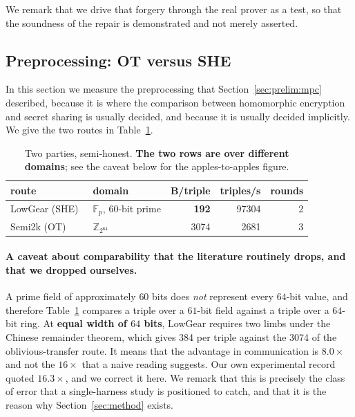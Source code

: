 \documentclass[11pt]{article}
\newcommand{\Z}{\mathbb{Z}}
\begin{document}
We remark that we drive that forgery through the real prover as a test, so that the
soundness of the repair is demonstrated and not merely asserted.

\subsection{Preprocessing: OT versus SHE}
\label{sec:triples}

In this section we measure the preprocessing that Section~\ref{sec:prelim:mpc} described,
because it is where the comparison between homomorphic encryption and secret sharing is
usually decided, and because it is usually decided implicitly. We give the two routes in
Table~\ref{tab:triples}.

\begin{table}[t]
\centering
\small
\begin{tabular}{@{}llrrr@{}}
\toprule
route & domain & B/triple & triples/s & rounds \\
\midrule
LowGear (SHE)~\cite{Overdrive} & $\mathbb{F}_p$, 60-bit prime & \textbf{192} & \num{97304} & 2 \\
Semi2k (OT)~\cite{MPSPDZ}      & $\Z_{2^{64}}$ & \num{3074} & \num{2681} & 3 \\
\bottomrule
\end{tabular}
\caption{Two parties, semi-honest. \textbf{The two rows are over different
domains}; see the caveat below for the apples-to-apples figure.}
\label{tab:triples}
\end{table}

\paragraph{A caveat about comparability that the literature routinely drops, and that we
dropped ourselves.} A prime field of approximately $60$ bits does \emph{not} represent every
$64$-bit value, and therefore Table~\ref{tab:triples} compares a triple over a $61$-bit field
against a triple over a $64$-bit ring. At \textbf{equal width of $64$ bits}, LowGear requires
two limbs under the Chinese remainder theorem, which gives \SI{384}{\byte} per triple against
the \num{3074} of the oblivious-transfer route. It means that the advantage in communication
is $\mathbf{8.0\times}$ and not the $16\times$ that a naive reading suggests. Our own
experimental record quoted $16.3\times$, and we correct it here. We remark that this is
precisely the class of error that a single-harness study is positioned to catch, and that it is
the reason why Section~\ref{sec:method} exists.
\end{document}
